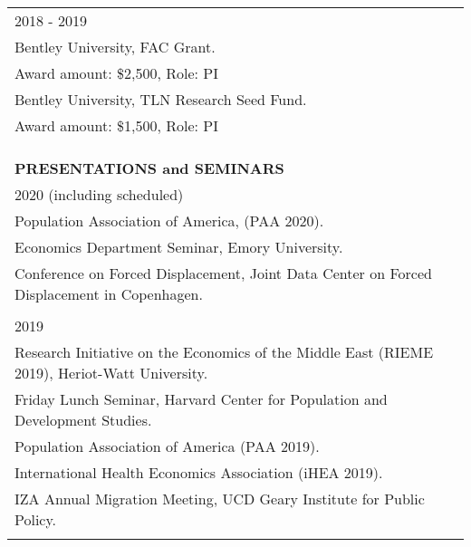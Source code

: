 \documentclass[12 pt]{article}
\begin{document}
\begin{longtable}{ccccc}
 \multicolumn{5}{l}{2018 - 2019} \\
 \multicolumn{5}{l}{Bentley University, FAC Grant.} \\
\multicolumn{5}{l}{Award amount: \$2,500, Role: PI}  \\

 \multicolumn{5}{l}{Bentley University, TLN Research Seed Fund.} \\
\multicolumn{5}{l}{Award amount: \$1,500, Role: PI} \\

\\
\\
\\
\multicolumn{5}{l}{\textbf{PRESENTATIONS and SEMINARS}} \\[2 pt]

\multicolumn{5}{l}{2020 (including scheduled)} \\
\multicolumn{5}{l}{Population Association of America, (PAA 2020).} \\ 
\multicolumn{5}{l}{Economics Department Seminar, Emory University.} \\ 
\multicolumn{5}{l}{Conference on Forced Displacement, Joint Data Center on Forced Displacement in Copenhagen.}\\
\\
\multicolumn{5}{l}{2019} \\
\multicolumn{5}{l}{Research Initiative on the Economics of the Middle East (RIEME 2019), Heriot-Watt University.} \\
\multicolumn{5}{l}{Friday Lunch Seminar, Harvard Center for Population and Development Studies.} \\
\multicolumn{5}{l}{Population Association of America (PAA 2019).} \\
\multicolumn{5}{l}{International Health Economics Association (iHEA 2019).} \\
\multicolumn{5}{l}{IZA Annual Migration Meeting, UCD Geary Institute for Public Policy.} \\

\\ 


\end{longtable}
\end{document}
